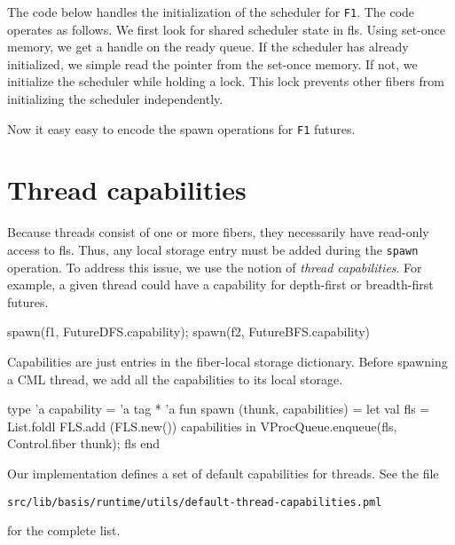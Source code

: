 \documentclass[11pt]{article}
\begin{document}
The code below handles the initialization of the scheduler for \texttt{F1}. The code operates as follows. We first look for shared scheduler state in fls. Using set-once memory, we get a handle on the ready queue. If the scheduler has already initialized, we simple read the pointer from the set-once memory. If not, we initialize the scheduler while holding a lock. This lock prevents other fibers from initializing the scheduler independently.
%

Now it easy easy to encode the spawn operations for \texttt{F1} futures.
%

\section{Thread capabilities}
Because threads consist of one or more fibers, they necessarily have read-only access to fls. Thus, any local storage entry must be added during the \texttt{spawn} operation. To address this issue, we use the notion of \emph{thread capabilities}. For example, a given thread could have a capability for depth-first or breadth-first futures.
\begin{centercode}
  spawn(f1, FutureDFS.capability);
  spawn(f2, FutureBFS.capability)
\end{centercode}

Capabilities are just entries in the fiber-local storage dictionary. Before spawning a CML thread, we add all the capabilities to its local storage.
\begin{centercode}
  type 'a capability = 'a tag * 'a
  fun spawn (thunk, capabilities) = let
        val fls = List.foldl FLS.add (FLS.new()) capabilities
        in
            VProcQueue.enqueue(fls, Control.fiber thunk);
            fls
        end
\end{centercode}

Our implementation defines a set of default capabilities for threads. See the file
\begin{center}
 \texttt{src/lib/basis/runtime/utils/default-thread-capabilities.pml} 
\end{center}
for the complete list.
\end{document}
